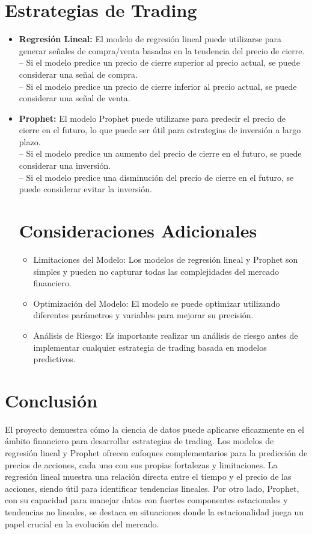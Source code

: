 \section{Estrategias de Trading}
\begin{itemize}
    \item \textbf{Regresión Lineal:} El modelo de regresión lineal puede utilizarse para generar señales de compra/venta basadas en la tendencia del precio de cierre.\\
–	Si el modelo predice un precio de cierre superior al precio actual, se puede considerar una señal de compra.\\
–	Si el modelo predice un precio de cierre inferior al precio actual, se puede considerar una señal de venta.
\item \textbf{Prophet:} El modelo Prophet puede utilizarse para predecir el precio de cierre en el futuro, lo que puede ser útil para estrategias de inversión a largo plazo. \\
–	Si el modelo predice un aumento del precio de cierre en el futuro, se puede considerar una inversión. \\
–	Si el modelo predice una disminución del precio de cierre en el futuro, se puede considerar evitar la inversión.

\section{Consideraciones Adicionales}
\begin{itemize}
    \item	Limitaciones del Modelo: Los modelos de regresión lineal y Prophet son simples y pueden no capturar todas las complejidades del mercado financiero.
\item	Optimización del Modelo: El modelo se puede optimizar utilizando diferentes parámetros y variables para mejorar su precisión.
\item	Análisis de Riesgo: Es importante realizar un análisis de riesgo antes de implementar cualquier estrategia de trading basada en modelos predictivos.

\end{itemize}


\end{itemize}
\section{Conclusión}
El proyecto demuestra cómo la ciencia de datos puede aplicarse eficazmente en el ámbito financiero para desarrollar estrategias de trading. Los modelos de regresión lineal y Prophet ofrecen enfoques complementarios para la predicción de precios de acciones, cada uno con sus propias fortalezas y limitaciones. La regresión lineal muestra una relación directa entre el tiempo y el precio de las acciones, siendo útil para identificar tendencias lineales. Por otro lado, Prophet, con su capacidad para manejar datos con fuertes componentes estacionales y tendencias no lineales, se destaca en situaciones donde la estacionalidad juega un papel crucial en la evolución del mercado.

